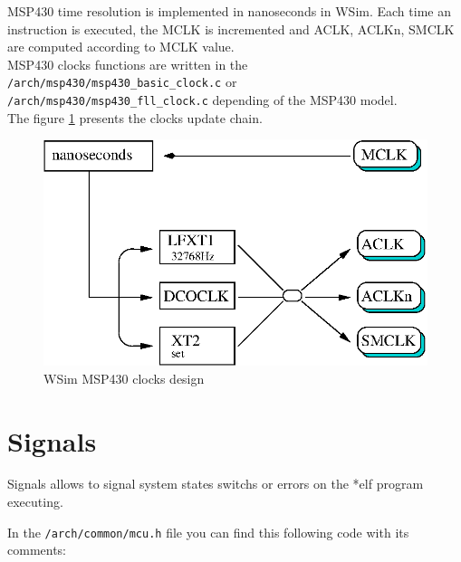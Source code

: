 \documentclass[a4paper,10pt]{report}
\begin{document}
MSP430 time resolution is implemented in nanoseconds in WSim. Each time an instruction is executed, the MCLK is incremented and ACLK, ACLKn, SMCLK are computed according to MCLK value.\\

MSP430 clocks functions are written in the \verb$/arch/msp430/msp430_basic_clock.c$ or\\ \verb$/arch/msp430/msp430_fll_clock.c$ depending of the MSP430 model.\\

The figure \ref{wsim-clocks} presents the clocks update chain.

\begin{figure}[!h]
\begin{center}
  \includegraphics[scale=0.9]{figures/wsim_clocks.eps}
\end{center}
\caption{WSim MSP430 clocks design}
\label{wsim-clocks}
\end{figure}




\section{Signals}
Signals allows to signal system states switchs or errors on the *elf program executing.

In the \verb$/arch/common/mcu.h$ file you can find this following code with its comments:
\end{document}
